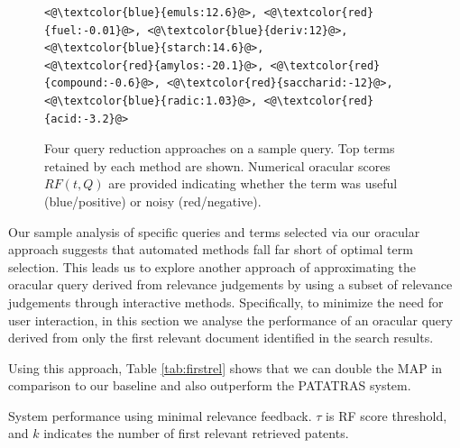 \begin{figure}[t!]
\begin{framed}
\begin{lstlisting}[basicstyle=\scriptsize\ttfamily , linewidth=\columnwidth,breaklines=true]
<@\textcolor{blue}{emuls:12.6}@>, <@\textcolor{red}{fuel:-0.01}@>, <@\textcolor{blue}{deriv:12}@>, <@\textcolor{blue}{starch:14.6}@>, 
<@\textcolor{red}{amylos:-20.1}@>, <@\textcolor{red}{compound:-0.6}@>, <@\textcolor{red}{saccharid:-12}@>, 
<@\textcolor{blue}{radic:1.03}@>, <@\textcolor{red}{acid:-3.2}@> 
 \end{lstlisting} 
 \vspace*{-2ex}
\end{framed}
 \vspace*{-2ex}
  \caption{Four query reduction approaches on a sample query.  Top
    terms retained by each method are shown.  Numerical oracular
    scores $\mathit{RF}(t,Q)$ are provided indicating whether the term
    was useful (blue/positive) or noisy (red/negative).}
  \label{fig:anecdotal}  
\end{figure}

Our sample analysis of specific queries and terms selected via our oracular
approach suggests that automated methods fall far short of optimal term selection.
This leads us to explore another approach of approximating the oracular query
derived from relevance judgements by using a subset of relevance judgements
through interactive methods.  Specifically, to minimize the need for user interaction,
in this section we analyse the performance of an oracular query derived from
only the first relevant document identified in the search results.

Using this approach, Table \ref{tab:firstrel} shows that we can double the MAP in comparison to our baseline and also outperform the PATATRAS system.

\begin{table}[t!]
  \begin{center}
   \caption{System performance using minimal relevance feedback. $\tau$ is RF score threshold, and $k$ indicates the number of first relevant retrieved patents.}\vspace{3mm}
     
  \label{tab:firstrel}
  \end{center}  
\end{table}

